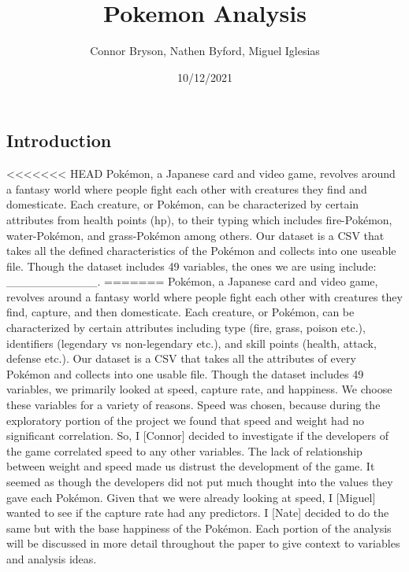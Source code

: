 \documentclass[
]{article}
\title{Pokemon Analysis}
\author{Connor Bryson, Nathen Byford, Miguel Iglesias}
\date{10/12/2021}
\begin{document}
\maketitle

\hypertarget{introduction}{%
\subsection{Introduction}\label{introduction}}

\textless\textless\textless\textless\textless\textless\textless{} HEAD
Pokémon, a Japanese card and video game, revolves around a fantasy world
where people fight each other with creatures they find and domesticate.
Each creature, or Pokémon, can be characterized by certain attributes
from health points (hp), to their typing which includes fire-Pokémon,
water-Pokémon, and grass-Pokémon among others. Our dataset is a CSV that
takes all the defined characteristics of the Pokémon and collects into
one useable file. Though the dataset includes 49 variables, the ones we
are using include: \_\_\_\_\_\_\_\_\_\_\_. ======= Pokémon, a Japanese
card and video game, revolves around a fantasy world where people fight
each other with creatures they find, capture, and then domesticate. Each
creature, or Pokémon, can be characterized by certain attributes
including type (fire, grass, poison etc.), identifiers (legendary vs
non-legendary etc.), and skill points (health, attack, defense etc.).
Our dataset is a CSV that takes all the attributes of every Pokémon and
collects into one usable file. Though the dataset includes 49 variables,
we primarily looked at speed, capture rate, and happiness. We choose
these variables for a variety of reasons. Speed was chosen, because
during the exploratory portion of the project we found that speed and
weight had no significant correlation. So, I {[}Connor{]} decided to
investigate if the developers of the game correlated speed to any other
variables. The lack of relationship between weight and speed made us
distrust the development of the game. It seemed as though the developers
did not put much thought into the values they gave each Pokémon. Given
that we were already looking at speed, I {[}Miguel{]} wanted to see if
the capture rate had any predictors. I {[}Nate{]} decided to do the same
but with the base happiness of the Pokémon. Each portion of the analysis
will be discussed in more detail throughout the paper to give context to
variables and analysis ideas.
\end{document}
